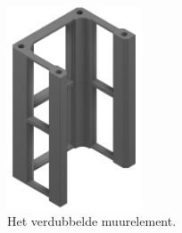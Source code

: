 \begin{minipage}[t]{0.49\textwidth}
    \vspace{0pt}
    \begin{figure}[H]
        \centering
        \includegraphics[height=6cm]{figures/Wall_2_w.png}
        \caption{Het verdubbelde muurelement.}\label{fig:dubbelemuur}
    \end{figure}
\end{minipage}\\

